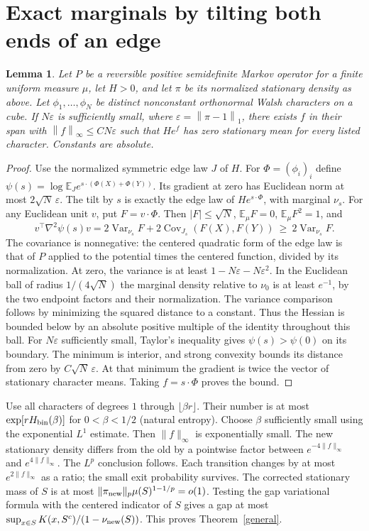 \documentclass[11pt]{article}
\newtheorem{lemma}[theorem]{Lemma}
\newcommand{\E}{\mathbb E}
\newcommand{\norm}[1]{\left\|#1\right\|}
\begin{document}
\section{Exact marginals by tilting both ends of an edge}
\begin{lemma}\label{tilt}
Let $P$ be a reversible positive semidefinite Markov operator for a finite uniform measure $\mu$, let $H>0$, and let $\pi$ be its normalized stationary density as above. Let $\phi_1,\ldots,\phi_N$ be distinct nonconstant orthonormal Walsh characters on a cube. If $N\varepsilon$ is sufficiently small, where $\varepsilon=\norm{\pi-1}_1$, there exists $f$ in their span with $\norm f_\infty\le C N\varepsilon$ such that $He^f$ has zero stationary mean for every listed character. Constants are absolute.
\end{lemma}
\begin{proof}
Use the normalized symmetric edge law $J$ of $H$. For $\Phi=(\phi_i)_i$ define $\psi(s)=\log \E_J e^{s\cdot(\Phi(X)+\Phi(Y))}$. Its gradient at zero has Euclidean norm at most $2\sqrt N\,\varepsilon$. The tilt by $s$ is exactly the edge law of $H e^{s\cdot\Phi}$, with marginal $\nu_s$. For any Euclidean unit $v$, put $F=v\cdot\Phi$. Then $|F|\le\sqrt N$, $\E_\mu F=0$, $\E_\mu F^2=1$, and
\[
 v^\top\nabla^2\psi(s)v
 =2\operatorname{Var}_{\nu_s}F+
    2\operatorname{Cov}_{J_s}(F(X),F(Y))
 \ \ge\ 2\operatorname{Var}_{\nu_s}F.
\]
The covariance is nonnegative: the centered quadratic form of the edge law is that of $P$ applied to the potential times the centered function, divided by its normalization. At zero, the variance is at least $1-N\varepsilon-N\varepsilon^2$. In the Euclidean ball of radius $1/(4\sqrt N)$ the marginal density relative to $\nu_0$ is at least $e^{-1}$, by the two endpoint factors and their normalization. The variance comparison follows by minimizing the squared distance to a constant. Thus the Hessian is bounded below by an absolute positive multiple of the identity throughout this ball. For $N\varepsilon$ sufficiently small, Taylor's inequality gives $\psi(s)>\psi(0)$ on its boundary. The minimum is interior, and strong convexity bounds its distance from zero by $C\sqrt N\,\varepsilon$. At that minimum the gradient is twice the vector of stationary character means. Taking $f=s\cdot\Phi$ proves the bound.
\end{proof}
Use all characters of degrees $1$ through $\lfloor\beta r\rfloor$. Their number is at most $\exp[r H_{\rm bin}(\beta)]$ for $0<\beta<1/2$ (natural entropy). Choose $\beta$ sufficiently small using the exponential $L^1$ estimate. Then $\|f\|_\infty$ is exponentially small. The new stationary density differs from the old by a pointwise factor between $e^{-4\|f\|_\infty}$ and $e^{4\|f\|_\infty}$. The $L^p$ conclusion follows. Each transition changes by at most $e^{2\|f\|_\infty}$ as a ratio; the small exit probability survives. The corrected stationary mass of $S$ is at most $\|\pi_{\rm new}\|_p\mu(S)^{1-1/p}=o(1)$. Testing the gap variational formula with the centered indicator of $S$ gives a gap at most $\sup_{x\in S}K(x,S^c)/(1-\nu_{\rm new}(S))$. This proves Theorem~\ref{general}.
\end{document}
